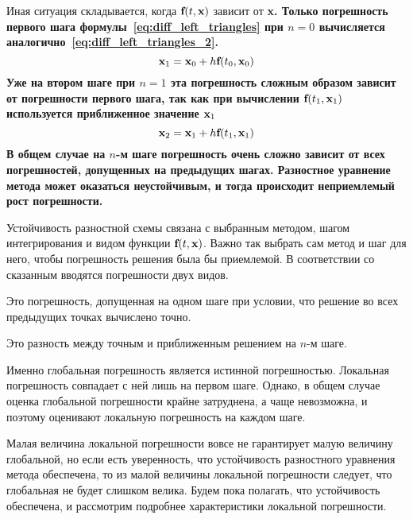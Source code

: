 \documentclass[../../calc-math-exam-2023.tex]{subfiles}
\begin{document}
    Иная ситуация складывается, когда $\bf{f}(t, \bf{x})$ зависит от \bf{x}. Только погрешность первого шага формулы~\eqref{eq:diff_left_triangles}
    при $n = 0$ вычисляется аналогично~\eqref{eq:diff_left_triangles_2}.
    \begin{equation*}
        \bf{x}_1 = \bf{x}_0 + h\bf{f}(t_0, \bf{x}_0)
    \end{equation*}
    Уже на втором шаге при $n = 1$ эта погрешность сложным образом зависит от погрешности первого шага, так как при
    вычислении $\bf{f}(t_1, \bf{x}_1)$ используется приближенное значение $\bf{x}_1$
    \begin{equation*}
        \bf{x}_2 = \bf{x}_1 + h\bf{f}(t_1, \bf{x}_1)
    \end{equation*}
    В общем случае на $n$-м шаге погрешность очень сложно зависит от всех погрешностей, допущенных на предыдущих шагах.
    Разностное уравнение метода может оказаться неустойчивым, и тогда происходит неприемлемый рост погрешности.

    Устойчивость разностной схемы связана с выбранным методом, шагом интегрирования и видом функции $\bf{f}(t, \bf{x})$.
    Важно так выбрать сам метод и шаг для него, чтобы погрешность решения была бы приемлемой. В соответствии со сказанным
    вводятся погрешности двух видов.
    \begin{definition}
        Это погрешность, допущенная на одном шаге при условии, что решение во всех предыдущих точках вычислено точно.
    \end{definition}
    \begin{definition}
        Это разность между точным и приближенным решением на $n$-м шаге.
    \end{definition}
    Именно глобальная погрешность является истинной погрешностью. Локальная погрешность совпадает с ней лишь на первом
    шаге. Однако, в общем случае оценка глобальной погрешности крайне затруднена, а чаще невозможна, и поэтому оценивают
    локальную погрешность на каждом шаге.

    Малая величина локальной погрешности вовсе не гарантирует малую величину глобальной, но если есть уверенность, что
    устойчивость разностного уравнения метода обеспечена, то из малой величины локальной погрешности следует, что
    глобальная не будет слишком велика. Будем пока полагать, что устойчивость обеспечена, и рассмотрим подробнее
    характеристики локальной погрешности.
\end{document}
